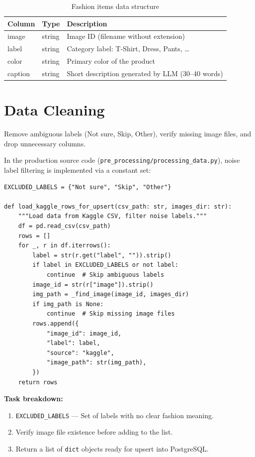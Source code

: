 \documentclass[12pt, twoside]{report}
\begin{document}
\begin{table}[H]
\centering
\begin{tabular}{lll}
\toprule
\textbf{Column} & \textbf{Type} & \textbf{Description}\\
\midrule
image   & string & Image ID (filename without extension)\\
label   & string & Category label: T-Shirt, Dress, Pants, \ldots\\
color   & string & Primary color of the product\\
caption & string & Short description generated by LLM (30--40 words)\\
\bottomrule
\end{tabular}
\caption{Fashion items data structure}
\end{table}

\section{Data Cleaning}

\begin{tcolorbox}[title=Method: Noise Label Filtering and Integrity Check]
Remove ambiguous labels (Not sure, Skip, Other), verify missing image files, and drop unnecessary columns.
\end{tcolorbox}

In the production source code (\texttt{pre\_processing/processing\_data.py}), noise label filtering is implemented via a constant set:

\begin{lstlisting}[caption={Noise label filtering --- processing\_data.py}]
EXCLUDED_LABELS = {"Not sure", "Skip", "Other"}

def load_kaggle_rows_for_upsert(csv_path: str, images_dir: str):
    """Load data from Kaggle CSV, filter noise labels."""
    df = pd.read_csv(csv_path)
    rows = []
    for _, r in df.iterrows():
        label = str(r.get("label", "")).strip()
        if label in EXCLUDED_LABELS or not label:
            continue  # Skip ambiguous labels
        image_id = str(r["image"]).strip()
        img_path = _find_image(image_id, images_dir)
        if img_path is None:
            continue  # Skip missing image files
        rows.append({
            "image_id": image_id,
            "label": label,
            "source": "kaggle",
            "image_path": str(img_path),
        })
    return rows
\end{lstlisting}

\textbf{Task breakdown:}
\begin{enumerate}
    \item \texttt{EXCLUDED\_LABELS} --- Set of labels with no clear fashion meaning.
    \item Verify image file existence before adding to the list.
    \item Return a list of \texttt{dict} objects ready for upsert into PostgreSQL.
\end{enumerate}
\end{document}
